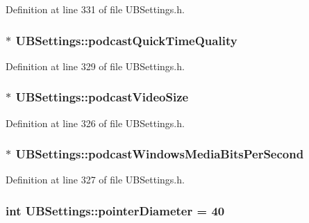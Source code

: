 Definition at line 331 of file U\-B\-Settings.\-h.

\hypertarget{class_u_b_settings_aa5f3b00cd5e8136cae4cd294c46f5634}{
\subsubsection[{podcast\-Quick\-Time\-Quality}]{$\ast$ U\-B\-Settings\-::podcast\-Quick\-Time\-Quality}}\label{db/d66/class_u_b_settings_aa5f3b00cd5e8136cae4cd294c46f5634}


Definition at line 329 of file U\-B\-Settings.\-h.

\hypertarget{class_u_b_settings_ab8756a27d8b5a900364370d7c97b6a9e}{
\subsubsection[{podcast\-Video\-Size}]{$\ast$ U\-B\-Settings\-::podcast\-Video\-Size}}\label{db/d66/class_u_b_settings_ab8756a27d8b5a900364370d7c97b6a9e}


Definition at line 326 of file U\-B\-Settings.\-h.

\hypertarget{class_u_b_settings_ad1dc0e79b487d48b5814d29fc394ad37}{
\subsubsection[{podcast\-Windows\-Media\-Bits\-Per\-Second}]{$\ast$ U\-B\-Settings\-::podcast\-Windows\-Media\-Bits\-Per\-Second}}\label{db/d66/class_u_b_settings_ad1dc0e79b487d48b5814d29fc394ad37}


Definition at line 327 of file U\-B\-Settings.\-h.

\hypertarget{class_u_b_settings_a5e5079f8062a48661b0a60b3656fc7c1}{
\subsubsection[{pointer\-Diameter}]{\setlength{\rightskip}{0pt plus 5cm}int U\-B\-Settings\-::pointer\-Diameter = 40\hspace{0.3cm}{\ttfamily [static]}}}\label{db/d66/class_u_b_settings_a5e5079f8062a48661b0a60b3656fc7c1}


